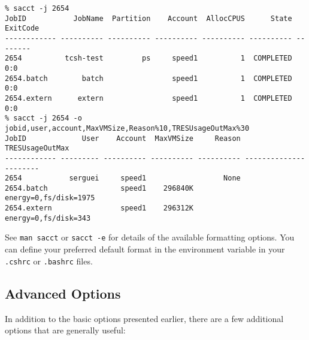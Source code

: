 \begin{itemize}
\small
\begin{verbatim}
% sacct -j 2654
JobID           JobName  Partition    Account  AllocCPUS      State ExitCode
------------ ---------- ---------- ---------- ---------- ---------- --------
2654          tcsh-test         ps     speed1          1  COMPLETED      0:0
2654.batch        batch                speed1          1  COMPLETED      0:0
2654.extern      extern                speed1          1  COMPLETED      0:0
% sacct -j 2654 -o jobid,user,account,MaxVMSize,Reason%10,TRESUsageOutMax%30
JobID             User    Account  MaxVMSize     Reason        TRESUsageOutMax
------------ --------- ---------- ---------- ---------- ----------------------
2654           serguei     speed1                  None
2654.batch                 speed1    296840K             energy=0,fs/disk=1975
2654.extern                speed1    296312K              energy=0,fs/disk=343
\end{verbatim}
\normalsize

See \texttt{man sacct} or \texttt{sacct -e} for details of the
available formatting options. You can define your preferred
default format in the  environment variable
in your \texttt{.cshrc} or \texttt{.bashrc} files.

\end{itemize}


\subsection{Advanced  Options}
\label{sect:submit-options}
\label{sect:qsub-options}

In addition to the basic  options presented earlier, there are a 
few additional options that are generally useful:

